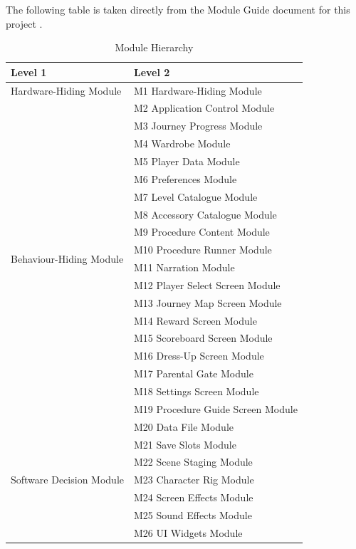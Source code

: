 \documentclass[10pt, titlepage]{article}
\begin{document}
The following table is taken directly from the Module Guide document for this project \cite{MG}.

\begin{table}[H]
\caption{Module Hierarchy}
\label{TblMH}
\renewcommand{\arraystretch}{1.3}
\begin{tabularx}{\textwidth}{@{}p{}X@{}}
\toprule
\textbf{Level 1} & \textbf{Level 2} \\
\midrule
Hardware-Hiding Module & M1 Hardware-Hiding Module \\
\midrule
\multirow{18}{0.31\textwidth}{Behaviour-Hiding Module}
& M2 Application Control Module \\
& M3 Journey Progress Module \\
& M4 Wardrobe Module \\
& M5 Player Data Module \\
& M6 Preferences Module \\
& M7 Level Catalogue Module \\
& M8 Accessory Catalogue Module \\
& M9 Procedure Content Module \\
& M10 Procedure Runner Module \\
& M11 Narration Module \\
& M12 Player Select Screen Module \\
& M13 Journey Map Screen Module \\
& M14 Reward Screen Module \\
& M15 Scoreboard Screen Module \\
& M16 Dress-Up Screen Module \\
& M17 Parental Gate Module \\
& M18 Settings Screen Module \\
& M19 Procedure Guide Screen Module \\
\midrule
\multirow{7}{0.31\textwidth}{Software Decision Module}
& M20 Data File Module \\
& M21 Save Slots Module \\
& M22 Scene Staging Module \\
& M23 Character Rig Module \\
& M24 Screen Effects Module \\
& M25 Sound Effects Module \\
& M26 UI Widgets Module \\
\bottomrule
\end{tabularx}
\end{table}
\end{document}
